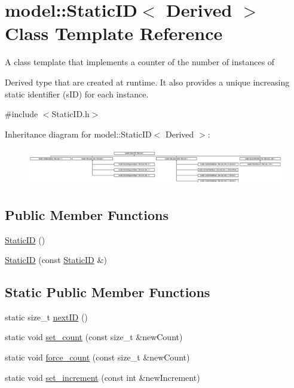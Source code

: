 \hypertarget{classmodel_1_1_static_i_d}{}\section{model\+:\+:Static\+I\+D$<$ Derived $>$ Class Template Reference}
\label{classmodel_1_1_static_i_d}


\begin{DoxyVerb}A class template that implements a counter of the number of instances of
\end{DoxyVerb}
 Derived type that are created at runtime. It also provides a unique increasing static identifier (s\+I\+D) for each instance.  




{\ttfamily \#include $<$Static\+I\+D.\+h$>$}

Inheritance diagram for model\+:\+:Static\+I\+D$<$ Derived $>$\+:\begin{figure}[H]
\begin{center}
\leavevmode
\includegraphics[height=1.651917cm]{classmodel_1_1_static_i_d}
\end{center}
\end{figure}
\subsection*{Public Member Functions}
\begin{DoxyCompactItemize}
\item 
\hyperlink{classmodel_1_1_static_i_d_a83e561b72deb7bf1bb81454144fc073c}{Static\+I\+D} ()
\item 
\hyperlink{classmodel_1_1_static_i_d_a1be28bcd4fbd54cde8c9d3acdd347baf}{Static\+I\+D} (const \hyperlink{classmodel_1_1_static_i_d}{Static\+I\+D} \&)
\end{DoxyCompactItemize}
\subsection*{Static Public Member Functions}
\begin{DoxyCompactItemize}
\item 
static size\+\_\+t \hyperlink{classmodel_1_1_static_i_d_a4d63d18dff46b56e3fd0b4dcff231a96}{next\+I\+D} ()
\item 
static void \hyperlink{classmodel_1_1_static_i_d_a3427e075194820a3993d2dc50675f561}{set\+\_\+count} (const size\+\_\+t \&new\+Count)
\item 
static void \hyperlink{classmodel_1_1_static_i_d_a66e898ed15bccf39ee69629b06d1b477}{force\+\_\+count} (const size\+\_\+t \&new\+Count)
\item 
static void \hyperlink{classmodel_1_1_static_i_d_a0653c60b44016dfc26bfa551c779c2af}{set\+\_\+increment} (const int \&new\+Increment)
\end{DoxyCompactItemize}

